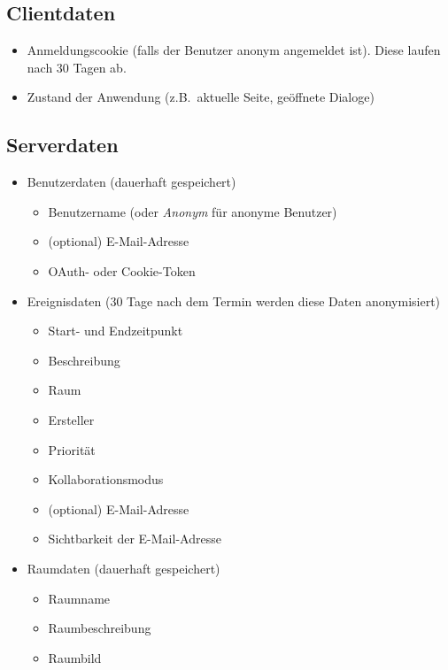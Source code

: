 
\subsection*{Clientdaten}
\begin{itemize}
    \item Anmeldungscookie (falls der Benutzer anonym angemeldet ist).
          Diese laufen nach 30 Tagen ab.
    \item Zustand der Anwendung (z.B.\ aktuelle Seite, geöffnete Dialoge)
\end{itemize}

\subsection*{Serverdaten}
\begin{itemize}
    \item Benutzerdaten (dauerhaft gespeichert)
    \begin{itemize}
        \item Benutzername (oder \textit{Anonym} für anonyme Benutzer)
        \item (optional) E-Mail-Adresse
        \item OAuth- oder Cookie-Token
    \end{itemize}
    \item Ereignisdaten (30 Tage nach dem Termin werden diese Daten anonymisiert)
    \begin{itemize}
        \item Start- und Endzeitpunkt 
        \item Beschreibung
        \item Raum
        \item Ersteller
        \item Priorität
        \item Kollaborationsmodus
        \item (optional) E-Mail-Adresse
        \item Sichtbarkeit der E-Mail-Adresse
    \end{itemize}
    \item Raumdaten (dauerhaft gespeichert)
    \begin{itemize}
        \item Raumname
        \item Raumbeschreibung
        \item Raumbild
    \end{itemize}
\end{itemize}